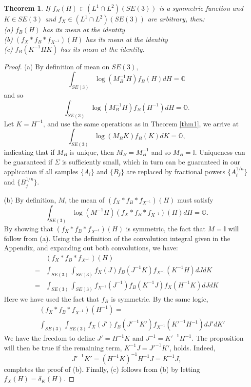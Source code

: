 \documentclass[twocolumn,10pt]{asme2ej}
\newtheorem{theorem}{Theorem}[section]
\begin{document}
\begin{theorem}
\label{thm2}
If $f_B(H) \in (L^1 \cap L^2)(SE(3))$ is a symmetric function and $K \in SE(3)$ and $f_X \in (L^1 \cap L^2)(SE(3))$ are arbitrary, then: \\
(a) $f_B(H)$ has its mean at the identity \\
(b)  $(f_X * f_B* f_{X^{-1}})(H)$ has its mean at the identity \\
(c) $f_B(K^{-1} H K)$ has its mean at the identity.
\end{theorem}

\begin{proof}
(a) By definition of mean on $SE(3)$,
$$ \int_{SE(3)} \log (M_B^{-1} H) f_B(H) dH = \mathbb{O} $$
and so
$$ \int_{SE(3)} \log (M_B^{-1} H) f_B(H^{-1}) dH = \mathbb{O}.$$
Let $K = H^{-1}$, and use the same operations as in Theorem \ref{thm1}, we arrive at
$$ \int_{SE(3)} \log (M_B K) f_B(K) dK = \mathbb{O}, $$
indicating that if $M_B$ is unique, then $M_B = M_B^{-1}$ and so $M_B = \mathbb{I}$.
Uniqueness can be guaranteed if $\Sigma$ is sufficiently small, which in turn can be guaranteed in our application if all samples $\{A_i\}$ and $\{B_j\}$ are replaced
by fractional powers $\{A_i^{1/n}\}$ and $\{B_j^{1/n}\}$.

(b) By definition, $M$, the mean of $(f_X * f_B* f_{X^{-1}})(H)$ must satisfy
$$ \int_{SE(3)} \log (M^{-1} H) (f_X * f_B* f_{X^{-1}})(H) dH = \mathbb{O}. $$
By showing that $(f_X * f_B* f_{X^{-1}})(H)$ is symmetric, the fact that $M = \mathbb{I}$ will follow from (a).
Using the definition of the convolution integral given in the Appendix, and expanding out both convolutions, we have:
\begin{equation}
\begin{split}
& (f_X * f_B* f_{X^{-1}})(H)\\
= &\int_{SE(3)} \int_{SE(3)}
f_X(J) f_B(J^{-1} K) f_{X^{-1}}(K^{-1} H) dJ dK
\\
= &\int_{SE(3)} \int_{SE(3)} f_{X^{-1}}(J^{-1}) f_B(K^{-1} J) f_{X}(H^{-1} K) dJ dK
\end{split}
\end{equation}
Here we have used the fact that $f_B$ is symmetric. By the same logic,
\begin{eqnarray*}
&& (f_X * f_B* f_{X^{-1}})(H^{-1}) = \\
&& \int_{SE(3)} \int_{SE(3)}
f_X(J') f_B(J'^{-1} K') f_{X^{-1}}(K'^{-1} H^{-1}) dJ' dK'
\end{eqnarray*}
We have the freedom to define $J'=H^{-1} K$ and $J^{-1} = K'^{-1} H^{-1}$.
The proposition will then be true if the remaining term,
$K^{-1} J = J'^{-1} K'$, holds. Indeed,
$$ J'^{-1} K' = (H^{-1} K)^{-1} H^{-1} J = K^{-1} J, $$
completes the proof of (b). Finally, (c) follows from (b) by letting $f_X(H) = \delta_K(H)$.
\end{proof}
\end{document}
